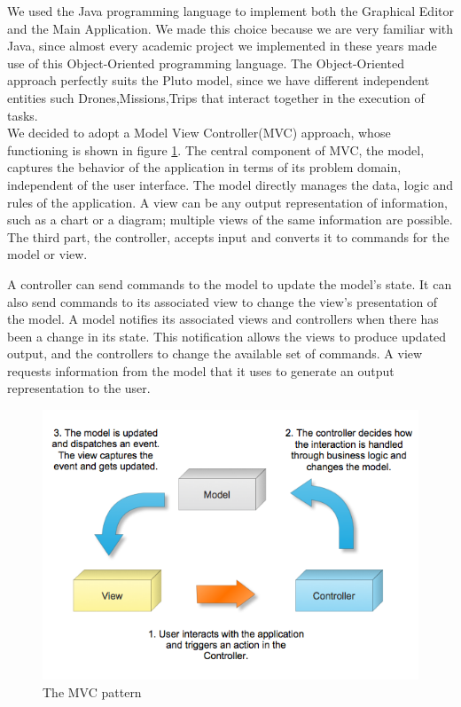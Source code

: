 
We used the Java programming language to implement both the Graphical Editor and the Main Application.
We made this choice because we are very familiar with Java, since almost every academic project we implemented in these years made use of this Object-Oriented programming language.
The Object-Oriented approach perfectly suits the Pluto model, since we have different independent entities such Drones,Missions,Trips that interact together in the execution of tasks.
\\

We decided to adopt a Model View Controller(MVC) approach, whose functioning is shown in figure \ref{fig:mvc}.
The central component of MVC, the model, captures the behavior of the application in terms of its problem domain, independent of the user interface.
The model directly manages the data, logic and rules of the application.
A view can be any output representation of information, such as a chart or a diagram; multiple views of the same information are possible.
The third part, the controller, accepts input and converts it to commands for the model or view.

A controller can send commands to the model to update the model's state.
It can also send commands to its associated view to change the view's presentation of the model.
A model notifies its associated views and controllers when there has been a change in its state. This notification allows the views to produce updated output, and the controllers to change the available set of commands.
A view requests information from the model that it uses to generate an output representation to the user.

\begin{figure}[H]
\centering
\includegraphics[width=\linewidth]
{pictures/MVC.png}
  \caption{The MVC pattern}
  \label{fig:mvc}
\end{figure}

